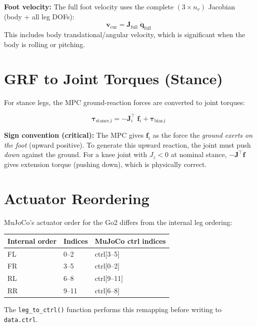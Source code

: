 \documentclass[12pt,a4paper]{report}
\newcommand{\vect}[1]{\bm{#1}}
\newcommand{\mat}[1]{\mathbf{#1}}
\begin{document}
\textbf{Foot velocity:} The full foot velocity uses the complete
$(3\times n_v)$ Jacobian (body + all leg DOFs):
\begin{equation}
    \vect{v}_\text{cur} = \mat{J}_\text{full}\;\dot{\vect{q}}_\text{full}
\end{equation}
This includes body translational/angular velocity, which is significant when
the body is rolling or pitching.

\section{GRF to Joint Torques (Stance)}

For stance legs, the MPC ground-reaction forces are converted to joint torques:

\begin{equation}
    \vect{\tau}_\text{stance,i} = -\mat{J}_i^\top\;\vect{f}_i + \vect{\tau}_\text{bias,i}
    \label{eq:stance_tau}
\end{equation}

\textbf{Sign convention (critical):} The MPC gives $\vect{f}_i$ as the force
the \emph{ground exerts on the foot} (upward positive).  To generate this
upward reaction, the joint must push \emph{down} against the ground.
For a knee joint with $J_z < 0$ at nominal stance, $-\mat{J}^\top\vect{f}$
gives extension torque (pushing down), which is physically correct.

\section{Actuator Reordering}

MuJoCo's actuator order for the Go2 differs from the internal leg ordering:

\begin{center}
\begin{tabular}{lll}
\toprule
\textbf{Internal order} & \textbf{Indices} & \textbf{MuJoCo ctrl indices} \\
\midrule
FL & 0--2  & ctrl[3--5] \\
FR & 3--5  & ctrl[0--2] \\
RL & 6--8  & ctrl[9--11] \\
RR & 9--11 & ctrl[6--8] \\
\bottomrule
\end{tabular}
\end{center}

The \texttt{leg\_to\_ctrl()} function performs this remapping before writing
to \texttt{data.ctrl}.
\end{document}
